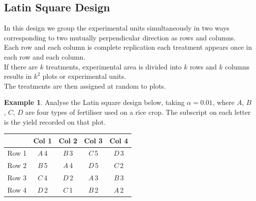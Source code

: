 \documentclass[11pt,a4paper]{article}
\theoremstyle{definition}
\newtheorem{example}[thm]{Example}
\begin{document}
\subsection{Latin Square Design}
In this design we group the experimental units simultaneously in two ways corresponding to two mutually perpendicular direction as rows and columns.\\ Each row and each column is complete replication each treatment appears once in each row and each column.\\ If there are $k$ treatments, experimental area is divided into $k$ rows and $k$ columns results in $k^2$ plots or experimental units.\\ The treatments are then assigned at random to plots.\\[1ex]
\begin{example}
Analyse the Latin square design below, taking $\alpha=0.01$, where $A$, $B$, $C$, $D$ are
four types of fertiliser used on a rice crop. The subscript on each letter is the yield
recorded on that plot.
\begin{table}[H]
\centering
\begin{tabular}{lcccc}
 & Col 1 & Col 2 & Col 3 & Col 4\\
\hline
Row 1 & $A$\,4 & $B$\,3 & $C$\,5 & $D$\,3\\
Row 2 & $B$\,5 & $A$\,4 & $D$\,5 & $C$\,2\\
Row 3 & $C$\,4 & $D$\,2 & $A$\,3 & $B$\,3\\
Row 4 & $D$\,2 & $C$\,1 & $B$\,2 & $A$\,2\\
\end{tabular}
\end{table}
\end{example}
\end{document}
